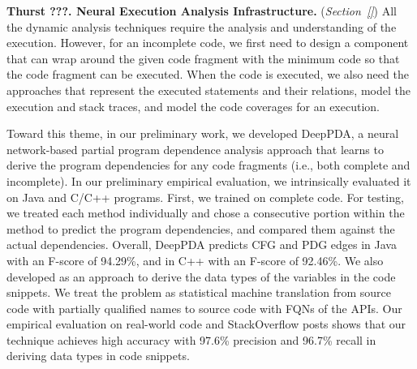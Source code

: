 \vspace{3pt}
\noindent \textbf{Thurst ???. Neural Execution Analysis Infrastructure.}
({\em Section~\ref{}}) All the dynamic analysis techniques require the
analysis and understanding of the execution. However, for an
incomplete code, we first need to design a component that can wrap
around the given code fragment with the minimum code so that the code
fragment can be executed. When the code is executed, we also need the
approaches that represent the executed statements and their relations,
model the execution and stack traces, and model the code coverages
for an execution.




Toward this theme, in our preliminary work, we developed DeepPDA, a
neural network-based partial program dependence analysis approach that
learns to derive the program dependencies for any code fragments
(i.e., both complete and incomplete). In our preliminary empirical
evaluation, we intrinsically evaluated it on Java and C/C++
programs. First, we trained {\tool} on complete code. For testing, we
treated each method individually and chose a consecutive portion
within the method to predict the program dependencies, and compared
them against the actual dependencies. Overall, DeepPDA predicts CFG
and PDG edges in Java with an F-score of 94.29\%, and in C++ with an
F-score of 92.46\%. We also developed as an approach to derive the
data types of the variables in the code snippets. We treat the problem
as statistical machine translation from source code with partially
qualified names to source code with FQNs of the APIs. Our empirical
evaluation on real-world code and StackOverflow posts shows that our
technique achieves high accuracy with 97.6\% precision and 96.7\%
recall in deriving data types in code snippets.

